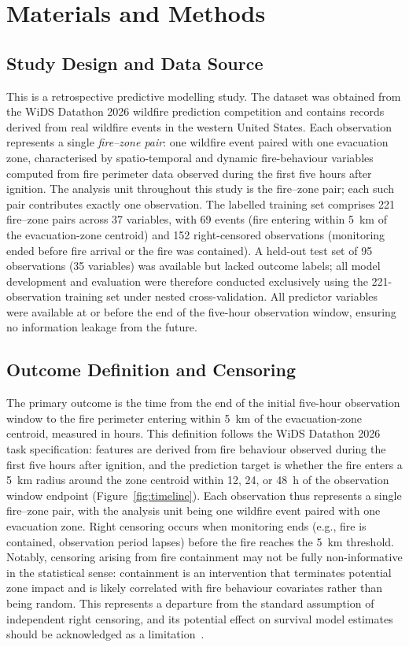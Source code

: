\documentclass[fire,article,submit,pdftex]{../Definitions/mdpi}
\begin{document}
\section{Materials and Methods}\label{sec:methods}

\subsection{Study Design and Data Source}\label{sec:data}

This is a retrospective predictive modelling study.
The dataset was obtained from the WiDS Datathon 2026 wildfire prediction competition and contains records derived from real wildfire events in the western United States.
Each observation represents a single \emph{fire--zone pair}: one wildfire event paired with one evacuation zone, characterised by spatio-temporal and dynamic fire-behaviour variables computed from fire perimeter data observed during the first five hours after ignition.
The analysis unit throughout this study is the fire--zone pair; each such pair contributes exactly one observation.
The labelled training set comprises 221 fire--zone pairs across 37 variables, with 69 events (fire entering within 5~km of the evacuation-zone centroid) and 152 right-censored observations (monitoring ended before fire arrival or the fire was contained).
A held-out test set of 95 observations (35 variables) was available but lacked outcome labels; all model development and evaluation were therefore conducted exclusively using the 221-observation training set under nested cross-validation.
All predictor variables were available at or before the end of the five-hour observation window, ensuring no information leakage from the future.

\subsection{Outcome Definition and Censoring}\label{sec:outcome}

The primary outcome is the time from the end of the initial five-hour observation window to the fire perimeter entering within 5~km of the evacuation-zone centroid, measured in hours.
This definition follows the WiDS Datathon 2026 task specification: features are derived from fire behaviour observed during the first five hours after ignition, and the prediction target is whether the fire enters a 5~km radius around the zone centroid within 12, 24, or 48~h of the observation window endpoint (Figure~\ref{fig:timeline}).
Each observation thus represents a single fire--zone pair, with the analysis unit being one wildfire event paired with one evacuation zone.
Right censoring occurs when monitoring ends (e.g., fire is contained, observation period lapses) before the fire reaches the 5~km threshold.
Notably, censoring arising from fire containment may not be fully non-informative in the statistical sense: containment is an intervention that terminates potential zone impact and is likely correlated with fire behaviour covariates rather than being random.
This represents a departure from the standard assumption of independent right censoring, and its potential effect on survival model estimates should be acknowledged as a limitation~\cite{Steyerberg2019}.
\end{document}

